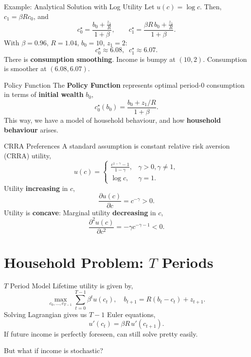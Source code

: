 \documentclass[10pt,aspectratio=169]{beamer}
\begin{document}
\begin{frame}{Example: Analytical Solution with Log Utility}
  Let $u(c) = \log c$. Then, $c_1 = \beta R c_0$, and
  \[
    c_0^\star = \frac{b_0 + \frac{z_1}{R}}{1+\beta},
    \qquad
    c_1^\star = \frac{\beta R \, b_0 + \frac{z_1}{R}}{1+\beta}.
  \]
  With $\beta = 0.96$, $R = 1.04$, $b_0 = 10$, $z_1 = 2$:
  \[
    c_0^\star \approx 6.08, \;\; c_1^\star \approx 6.07.
  \]
  There is \textbf{consumption smoothing}. Income is bumpy at $(10, 2)$. Consumption is smoother at $(6.08, 6.07)$.
\end{frame}

\begin{frame}{Policy Function}
  The \textbf{Policy Function} represents optimal period-0 consumption in terms of \textbf{initial wealth} $b_0$,
  \[
    c_0^\star(b_0) = \frac{b_0 + z_1/R}{1+\beta}.
  \]
  This way, we have a model of household behaviour, and how \textbf{household behaviour} arises.
\end{frame}

\begin{frame}{CRRA Preferences}
  A standard assumption is constant relative risk aversion (CRRA) utility,
  \[
    u(c) = \begin{cases}
      \frac{c^{1-\gamma}-1}{1-\gamma}, & \gamma > 0, \gamma \neq 1, \\
      \log c, & \gamma = 1.
    \end{cases}
  \]
  Utility \textbf{increasing} in $c$,
  \[
    \frac{\partial u(c)}{\partial c} = c^{-\gamma} > 0.
  \]
  Utility is \textbf{concave}: Marginal utility \textbf{decreasing} in $c$,
  \[
    \frac{\partial^2 u(c)}{\partial c^2} = -\gamma c^{-\gamma-1} < 0.
  \]
\end{frame}

\section{Household Problem: $T$ Periods}

\begin{frame}{$T$ Period Model}
  Lifetime utility is given by,
  \[
    \max_{c_0, \ldots, c_{T-1}} \sum_{t=0}^{T-1} \beta^t u(c_t),
    \quad b_{t+1} = R(b_t - c_t) + z_{t+1}.
  \]
  Solving Lagrangian gives us $T-1$ Euler equations,
  \[
    u'(c_t) = \beta R \, u'(c_{t+1}).
  \]
  If future income is perfectly foreseen, can still solve pretty easily.

  But what if income is stochastic?
\end{frame}
\end{document}
